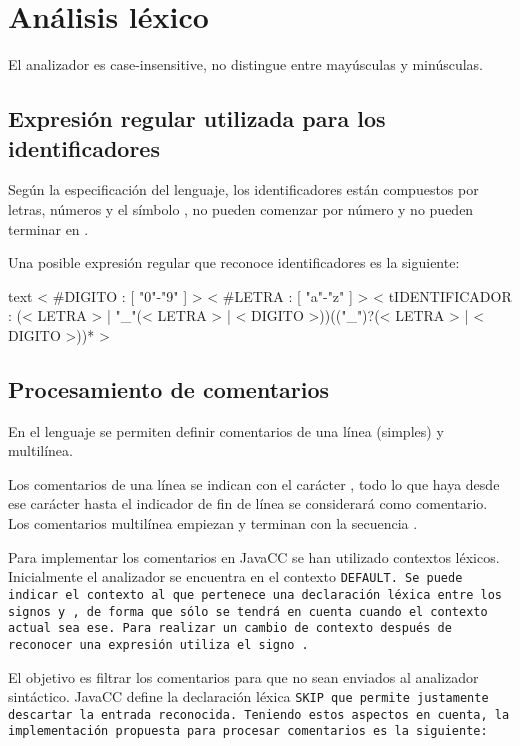 \documentclass[../main.tex]{subfiles}
\begin{document}
\section{Análisis léxico}
El analizador es case-insensitive, no distingue entre mayúsculas y minúsculas.

\subsection{Expresión regular utilizada para los identificadores}
Según la especificación del lenguaje, los identificadores están compuestos por letras, números y el símbolo \car{\_}, no pueden comenzar por número y no pueden terminar en \car{\_}.

Una posible expresión regular que reconoce identificadores es la siguiente:
\begin{codigo}{text}
< #DIGITO : [ "0"-"9" ] >
< #LETRA : [ "a"-"z" ] >
< tIDENTIFICADOR : 
  (< LETRA > | "_"(< LETRA > | < DIGITO >))(("_")?(< LETRA > | < DIGITO >))* >
\end{codigo}

\subsection{Procesamiento de comentarios}
En el lenguaje se permiten definir comentarios de una línea (simples) y multilínea.

Los comentarios de una línea se indican con el carácter \car{\%}, todo lo que haya desde ese carácter hasta el indicador de fin de línea se considerará como comentario. Los comentarios multilínea empiezan y terminan con la secuencia \car{\%\%}.

Para implementar los comentarios en JavaCC se han utilizado contextos léxicos.
Inicialmente el analizador se encuentra en el contexto \tt{DEFAULT}.
Se puede indicar el contexto al que pertenece una declaración léxica entre los signos \car{\textless} y \car{\textgreater}, de forma que sólo se tendrá en cuenta cuando el contexto actual sea ese. Para realizar un cambio de contexto después de reconocer una expresión utiliza el signo \car{:}.

El objetivo es filtrar los comentarios para que no sean enviados al analizador sintáctico. JavaCC define la declaración léxica \tt{SKIP} que permite justamente descartar la entrada reconocida. Teniendo estos aspectos en cuenta, la implementación propuesta para procesar comentarios es la siguiente:
\end{document}
